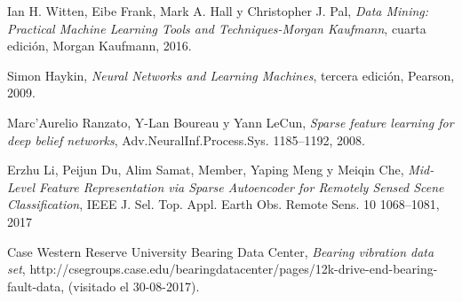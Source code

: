 \documentclass[12pt]{article}%
\begin{document}
\begin{thebibliography}{9}
Ian H. Witten, Eibe Frank, Mark A. Hall y Christopher J. Pal, \textit{Data Mining: Practical Machine Learning Tools and Techniques-Morgan Kaufmann}, cuarta edición, Morgan Kaufmann, 2016.

Simon Haykin, \textit{Neural Networks and Learning Machines}, tercera edición, Pearson, 2009.

Marc’Aurelio Ranzato, Y-Lan Boureau y Yann LeCun, \textit{Sparse feature learning for deep belief networks}, Adv.NeuralInf.Process.Sys. 1185–1192, 2008.

Erzhu Li, Peijun Du, Alim Samat, Member, Yaping Meng y Meiqin Che, \textit{Mid-Level Feature Representation via Sparse Autoencoder for Remotely Sensed Scene Classification}, IEEE J. Sel. Top. Appl. Earth Obs. Remote Sens. 10 1068–1081, 2017

Case Western Reserve University Bearing Data Center, \textit{Bearing vibration data set}, http://csegroups.case.edu/bearingdatacenter/pages/12k-drive-end-bearing-fault-data, (visitado el 30-08-2017).


\end{thebibliography}
\end{document}
